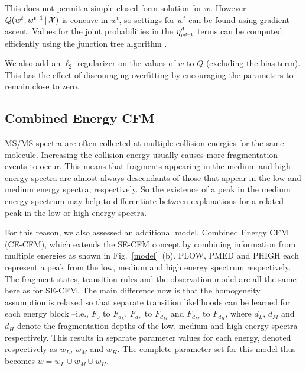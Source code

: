 This does not permit a simple closed-form solution for $w$. However $Q(w^{t},w^{t\hspace{-1pt}-\hspace{-1pt}1}\,|\,\mathcal{X})$  is concave in $w^{t}$, so settings for $w^{t}$ can be found using gradient ascent. 
Values for the joint probabilities in the $\eta_{w^{t\hspace{-1pt}-\hspace{-1pt}1}}^{d}$ terms can be computed efficiently using the junction tree algorithm \citep{Koller2009}. 

We also add an $\ell_{2}$ regularizer on the values of $w$ to $Q$ (excluding the bias term). 
This has the effect of discouraging overfitting by encouraging the parameters to remain close to zero.

\subsection{Combined Energy CFM}
\label{CombinedEnergyModel}

MS/MS spectra are often collected at multiple collision energies for the same molecule. 
Increasing the collision energy usually causes more fragmentation events to occur.
This means that fragments appearing in the medium and high energy spectra are almost always descendants 
of those that appear in the low and medium energy spectra, respectively.
So the existence of a peak in the medium energy spectrum may help to differentiate between explanations for a related peak in the low or high energy spectra. 

For this reason, we also assessed an additional model, Combined Energy CFM (CE-CFM), which extends the SE-CFM concept by combining information from multiple energies as shown in Fig.~\ref{model}~(b). P{\tiny LOW}, P{\tiny MED} and P{\tiny HIGH} each represent a peak from the low, medium and high energy spectrum respectively.
The fragment states, transition rules and the observation model are all the same here as for SE-CFM. 
The main difference now is that the homogeneity assumption is relaxed so that separate transition likelihoods can be learned for each energy block --i.e., $F_{0}$ to $F_{d_{L}}$, $F_{d_{L}}$ to $F_{d_{M}}$ and $F_{d_{M}}$ to $F_{d_{H}}$, where $d_{L}$, $d_{M}$ and  $d_{H}$ denote the fragmentation depths of the low, medium and high energy spectra respectively. This results in separate parameter values for each energy, denoted respectively as $w_{L}$, $w_{M}$ and $w_{H}$. 
The complete parameter set for this model thus becomes $w = w_{L}\cup w_{M}\cup w_{H}$. 

